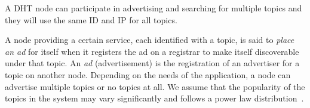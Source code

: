 A DHT node can participate in advertising and searching for multiple topics and they will use the same ID and IP for all topics.

A node providing a certain service,  each identified with a topic, is said to \emph{place an ad} for itself when it registers the ad on a registrar to make itself discoverable under that topic. 
An \emph{ad} (\ie advertisement) is the registration of an advertiser for a topic on another node. 
Depending on the needs of the application, a node can advertise multiple topics or no topics at all. 
We assume that the popularity of the topics in the system may vary significantly and follows a power law distribution~\cite{kim2018measuring}.


